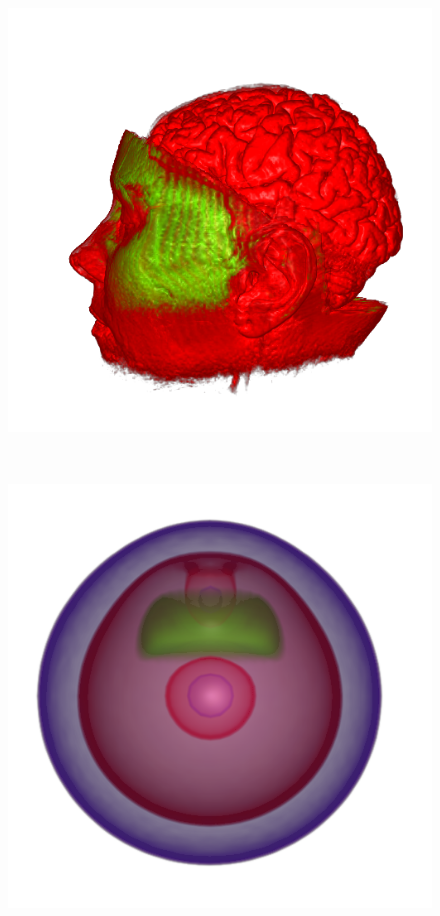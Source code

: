 \begin{figure}
\begin{minipage}{.15\textwidth}
\end{minipage}~
\begin{minipage}{.15\textwidth}
	\includegraphics[width=1\linewidth]{images/MRbrain_naive}
\end{minipage}~
\begin{minipage}{.15\textwidth}
	\includegraphics[width=1\linewidth]{images/nucleon_naive}

\end{minipage}
\end{figure}

